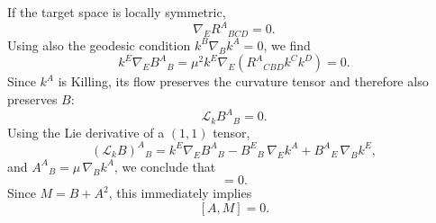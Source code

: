 \documentclass[a4paper,11pt]{article}
\begin{document}
\begin{appendix}
If the target space is locally symmetric,
\begin{equation}
  \nabla_E R^A{}_{BCD}=0.
\end{equation}
Using also the geodesic condition $k^B\nabla_B k^A=0$, we find
\begin{equation}
  k^E\nabla_E B^A{}_B = \mu^2 k^E\nabla_E\left(R^A{}_{CBD}k^Ck^D\right) =0.
\end{equation}
Since $k^A$ is Killing, its flow preserves the curvature tensor and therefore also preserves $B$:
\begin{equation}
  \mathcal L_k B^A{}_B=0.
\end{equation}
Using the Lie derivative of a $(1,1)$ tensor,
\begin{equation}
  (\mathcal L_k B)^A{}_B = k^E\nabla_E B^A{}_B -B^E{}_B\,\nabla_E k^A +B^A{}_E\,\nabla_B k^E,
\end{equation}
and $A^A{}_B=\mu\,\nabla_B k^A$, we conclude that
\begin{equation}
  [A,B]=0.
\end{equation}
Since $M=B+A^2$, this immediately implies
\begin{equation}\label{eq:locally-symmetric-AM-commute}
  [A,M]=0.
\end{equation}


\end{appendix}
\end{document}
